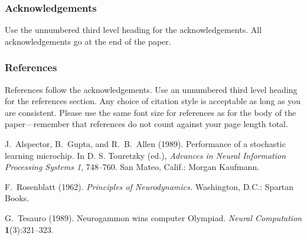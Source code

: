 \documentclass[twoside]{article}
\begin{document}
\subsubsection*{Acknowledgements}

Use the unnumbered third level heading for the acknowledgements.  All
acknowledgements go at the end of the paper.

\subsubsection*{References}

References follow the acknowledgements.  Use an unnumbered third level
heading for the references section.  Any choice of citation style is
acceptable as long as you are consistent.  Please use the same font
size for references as for the body of the paper---remember that
references do not count against your page length total.

\begin{thebibliography}{}
\setlength{\itemindent}{-\leftmargin}
\makeatletter\renewcommand{\@biblabel}[1]{}\makeatother
\bibitem{} J.~Alspector, B.~Gupta, and R.~B.~Allen (1989).
    \newblock Performance of a stochastic learning microchip.
    \newblock In D. S. Touretzky (ed.),
    \textit{Advances in Neural Information Processing Systems 1}, 748--760.
    San Mateo, Calif.: Morgan Kaufmann.

\bibitem{} F.~Rosenblatt (1962).
    \newblock \textit{Principles of Neurodynamics.}
    \newblock Washington, D.C.: Spartan Books.

\bibitem{} G.~Tesauro (1989).
    \newblock Neurogammon wins computer Olympiad.
    \newblock \textit{Neural Computation} \textbf{1}(3):321--323.
\end{thebibliography}
\end{document}
